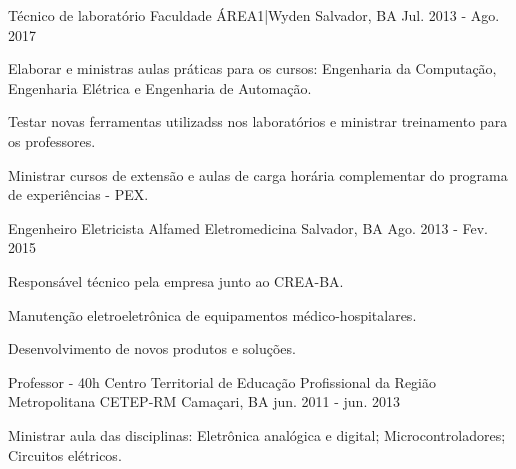 \begin{cventries}
  \cventry
    {Técnico de laboratório} %
    {Faculdade ÁREA1|Wyden} %
    {Salvador, BA} %
    {Jul. 2013 - Ago. 2017} %
    {
      \begin{cvitems} %
        \item {Elaborar e ministras aulas práticas para os cursos: Engenharia da Computação, Engenharia Elétrica e Engenharia de Automação.}
        \item {Testar novas ferramentas utilizadss nos laboratórios e ministrar treinamento para os professores.}
        \item { Ministrar cursos de extensão e aulas de carga horária complementar do programa de experiências - PEX.}
      \end{cvitems}
    }

  \cventry
    {Engenheiro Eletricista} %
    {Alfamed Eletromedicina} %
    {Salvador, BA} %
    {Ago. 2013 - Fev. 2015} %
    {
      \begin{cvitems} %
        \item {Responsável técnico pela empresa junto ao CREA-BA.}
        \item {Manutenção eletroeletrônica de equipamentos médico-hospitalares.}
        \item {Desenvolvimento de novos produtos e soluções.}
      \end{cvitems}
    }
    

  \cventry
    {Professor - 40h} %
    {Centro Territorial de Educação Profissional da Região Metropolitana CETEP-RM} %
    {Camaçari, BA} %
    {jun. 2011 - jun. 2013} %
    {
      \begin{cvitems} %
        \item {Ministrar aula das disciplinas: Eletrônica analógica e digital; Microcontroladores; Circuitos elétricos.}
      \end{cvitems}
    }
    

\end{cventries}
